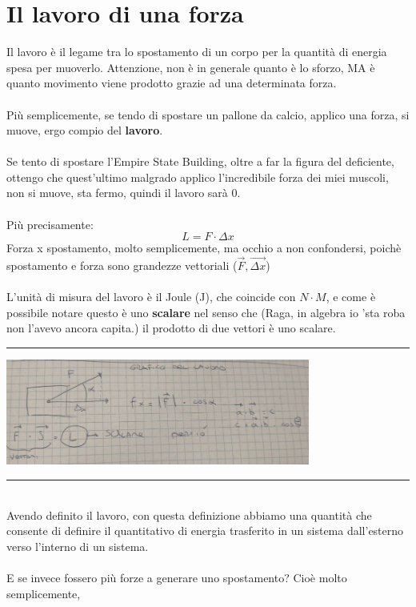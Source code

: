 \documentclass[12pt, a4paper, openany, oneside]{book}
\begin{document}
\section{Il lavoro di una forza}
Il lavoro è il legame tra lo spostamento di un corpo per la quantità di energia
spesa per muoverlo. Attenzione, non è in generale quanto è lo sforzo, MA è quanto
movimento viene prodotto grazie ad una determinata forza. \\ \\
Più semplicemente, se tendo di spostare un pallone da calcio, applico una forza,
si muove, ergo compio del \textbf{lavoro}. \\ \\
Se tento di spostare l'Empire State Building, oltre a far la figura del deficiente,
ottengo che quest'ultimo malgrado applico l'incredibile forza dei miei muscoli,
non si muove, sta fermo, quindi il lavoro sarà 0.
\\  \\
Più precisamente:
\[L = F \cdot \Delta x\]
Forza x spostamento, molto semplicemente, ma occhio a non confondersi, poichè
spostamento e forza sono grandezze vettoriali ($\overrightarrow{F}, 
\overrightarrow{\Delta x}$)
\\ \\
L'unità di misura del lavoro è il Joule (J), che coincide con $N\cdot M$, e come
è possibile notare questo è uno \textbf{scalare} nel senso che (Raga, in algebra
io 'sta roba non l'avevo ancora capita.) il prodotto di due vettori è uno scalare.
\\
{\color{black} \rule{\linewidth}{0.3mm}}
\begin{center}
\includegraphics[width=0.75\textwidth]{graficoLavoro}
\end{center}
{\color{black} \rule{\linewidth}{0.3mm}}
\\
Avendo definito il lavoro, con questa definizione abbiamo una quantità che 
consente di definire il quantitativo di energia trasferito in un sistema
dall'esterno verso l'interno di un sistema. \\ \\
E se invece fossero più forze a generare uno spostamento? Cioè molto semplicemente,
\end{document}
